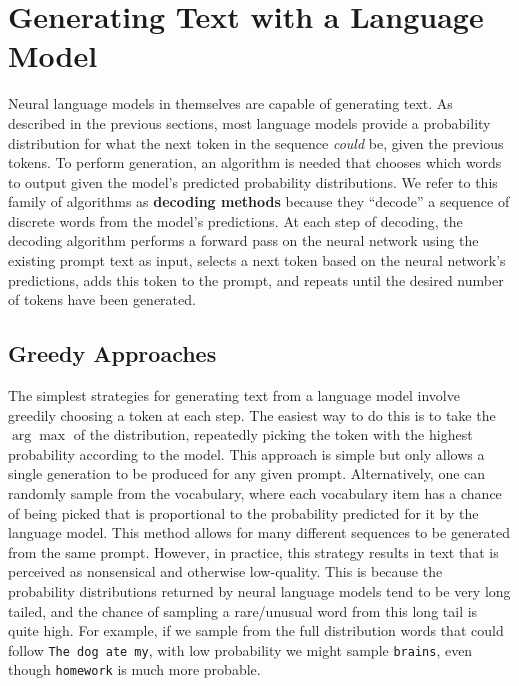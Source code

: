 \section{Generating Text with a Language Model}
\label{section:background_gen}

Neural language models in themselves are capable of generating text.
As described in the previous sections, most language models provide a probability distribution for what the next token in the sequence \textit{could} be, given the previous tokens.
To perform generation, an algorithm is needed that chooses which words to output given the model's predicted probability distributions.
We refer to this family of algorithms as \textbf{decoding methods} because they ``decode'' a sequence of discrete words from the model's predictions.
At each step of decoding, the decoding algorithm performs a forward pass on the neural network using the existing prompt text as input, selects a next token based on the neural network's predictions, adds this token to the prompt, and repeats until the desired number of tokens have been generated.

\subsection{Greedy Approaches}
The simplest strategies for generating text from a language model involve greedily choosing a token at each step.
The easiest way to do this is to take the $\arg \max$ of the distribution, repeatedly picking the token with the highest probability according to the model.
This approach is simple but only allows a single generation to be produced for any given prompt.
Alternatively, one can randomly sample from the vocabulary, where each vocabulary item has a chance of being picked that is proportional to the probability predicted for it by the language model.
This method allows for many different sequences to be generated from the same prompt.
However, in practice, this strategy results in text that is perceived as nonsensical and otherwise low-quality.
This is because the probability distributions returned by neural language models tend to be very long tailed, and the chance of sampling a rare/unusual word from this long tail is quite high. For example, if we sample from the full distribution words that could follow \texttt{The dog ate my}, with low probability we might sample \texttt{brains}, even though \texttt{homework} is much more probable.


